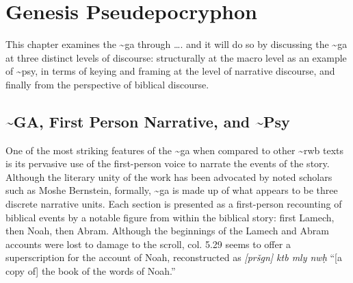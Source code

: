 \hypertarget{genesis-pseudepocryphon}{%
\chapter{Genesis Pseudepocryphon}\label{genesis-pseudepocryphon}}

This chapter examines the \textasciitilde{}ga through \ldots{}. and it
will do so by discussing the \textasciitilde{}ga at three distinct
levels of discourse: structurally at the macro level as an example of
\textasciitilde{}psy, in terms of keying and framing at the level of
narrative discourse, and finally from the perspective of biblical
discourse.

\hypertarget{ga-first-person-narrative-and-psy}{%
\section{\textasciitilde{}GA, First Person Narrative, and
\textasciitilde{}Psy}\label{ga-first-person-narrative-and-psy}}

One of the most striking features of the \textasciitilde{}ga when
compared to other \textasciitilde{}rwb texts is its pervasive use of the
first-person voice to narrate the events of the story. Although the
literary unity of the work has been advocated by noted scholars such as
Moshe Bernstein, formally, \textasciitilde{}ga is made up of what
appears to be three discrete narrative
units.\autocite{bernstein_jbl2009} Each section is presented as a
first-person recounting of biblical events by a notable figure from
within the biblical story: first Lamech, then Noah, then Abram. Although
the beginnings of the Lamech and Abram accounts were lost to damage to
the scroll, col. 5.29 seems to offer a superscription for the account of
Noah, reconstructed as \emph{{[}pršgn{]} ktb mly nwḥ} ``{[}a copy of{]}
the book of the words of Noah.''

